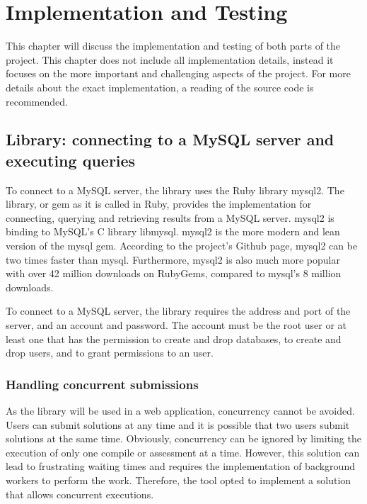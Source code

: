  \chapter{Implementation and Testing}

This chapter will discuss the implementation and testing of both parts of the project. This chapter does not include all implementation details, instead it focuses on the more important and challenging aspects of the project. For more details about the exact implementation, a reading of the source code is recommended.

\section{Library: connecting to a MySQL server and executing queries} \label{ch:impllib:sec:connecting}
To connect to a MySQL server, the library uses the Ruby library mysql2. The library, or gem as it is called in Ruby, provides the implementation for connecting, querying and retrieving results from a MySQL server. mysql2 is binding to MySQL's C library libmysql. mysql2 is the more modern and lean version of the mysql gem. According to the project's Github page, mysql2 can be two times faster than mysql. Furthermore, mysql2 is also much more popular with over 42 million downloads on RubyGems, compared to mysql's 8 million downloads.

To connect to a MySQL server, the library requires the address and port of the server, and an account and password. The account must be the root user or at least one that has the permission to create and drop databases, to create and drop users, and to grant permissions to an user.

\subsection{Handling concurrent submissions}

As the library will be used in a web application, concurrency cannot be avoided. Users can submit solutions at any time and it is possible that two users submit solutions at the same time. Obviously, concurrency can be ignored by limiting the execution of only one compile or assessment at a time. However, this solution can lead to frustrating waiting times and requires the implementation of background workers to perform the work. Therefore, the tool opted to implement a solution that allows concurrent executions.

